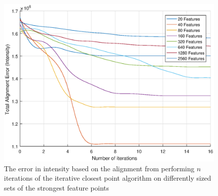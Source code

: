 \documentclass{article}
\begin{document}
\begin{figure}[h]
	\centering
	\includegraphics[width=\textwidth]{figures/alignment/error_for_alignment}
	\caption{The error in intensity based on the alignment from performing $n$ iterations of the iterative closest point algorithm on differently sized sets of the strongest feature points}
	\label{fig_results_alignment_error_plot}
\end{figure}

\pagebreak



\end{document}
